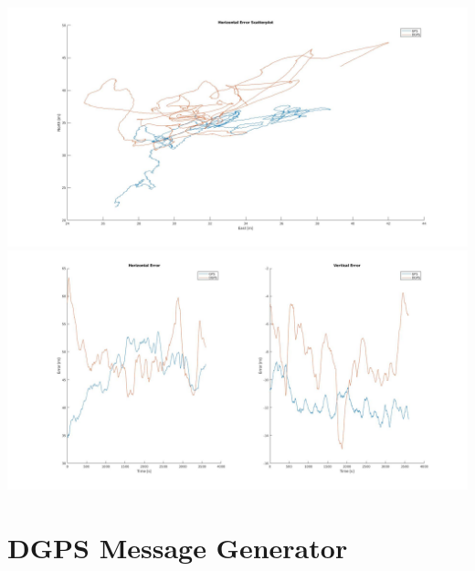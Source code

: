 \centering
\includegraphics[width=\textwidth]{appendix/C_Matlab/Scatterplot.jpg}
\includegraphics[width=\textwidth]{appendix/C_Matlab/Horizontal_Vertical_Errors.jpg}


\chapter{DGPS Message Generator}